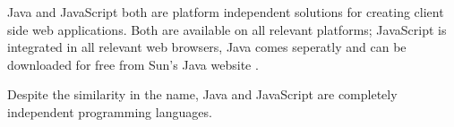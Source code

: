 
Java and JavaScript both are platform independent solutions for creating client side web applications. Both are available on all relevant platforms; JavaScript is integrated in all relevant web browsers, Java comes seperatly and can be downloaded for free from Sun's Java website \cite{SunJava}.

Despite the similarity in the name, Java and JavaScript are completely independent programming languages.